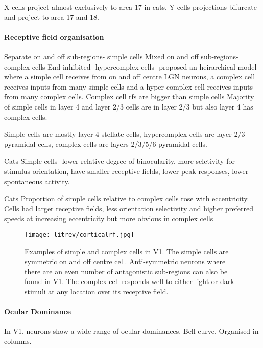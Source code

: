 \cite{Stone1973} X cells project almost exclusively to area 17 in cats, Y cells projections bifurcate and project to area 17 and 18. 

\paragraph{Receptive field organisation}

Separate on and off sub-regions- simple cells
Mixed on and off sub-regions- complex cells
End-inhibited- hypercomplex cells- proposed an heirarchical model where a simple cell receives from on and off centre LGN neurons, a complex cell receives inputs from many simple cells and a hyper-complex cell receives inputs from many complex cells. 
Complex cell rfs are bigger than simple cells
Majority of simple cells in layer 4 and layer 2/3 cells are in layer 2/3 but also layer 4 has complex cells.

\cite{Kelly1974} Simple cells are mostly layer 4 stellate cells, hypercomplex cells are layer 2/3 pyramidal cells, complex cells are layers 2/3/5/6 pyramidal cells. 

\cite{Leventhal1978} Cats Simple cells- lower relative degree of binocularity, more selctivity for stimulus orientation, have smaller receptive fields, lower peak responses, lower spontaneous activity.

\cite{Wilson1976a} Cats Proportion of simple cells relative to complex cells rose with eccentricity. Cells had larger receptive fields, less orientation selectivity and higher preferred speeds at increasing eccentricity but more obvious in complex cells
\begin{figure}[H]
	
	\texttt{[image: litrev/corticalrf.jpg]}
	\centering
	\caption{Examples of simple and complex cells in V1. The simple cells are symmetric on and off centre cell. Anti-symmetric neurons where there are an even number of antagonistic sub-regions can also be found in V1. The complex cell responds well to either light or dark stimuli at any location over its receptive field.}
	
	\label{fig:rforgV1}
\end{figure}

\paragraph{Ocular Dominance}
In V1, neurons show a wide range of ocular dominances. Bell curve. Organised in columns.

